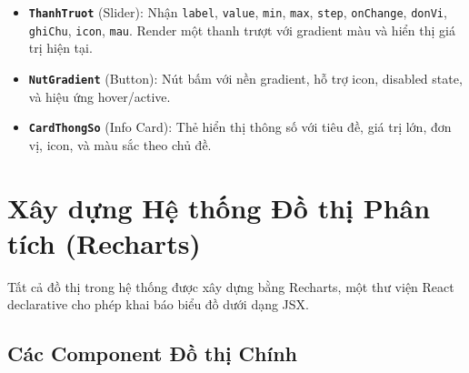 \begin{itemize}
    \item \textbf{\texttt{ThanhTruot}} (Slider): Nhận \texttt{label}, \texttt{value}, \texttt{min}, \texttt{max}, \texttt{step}, \texttt{onChange}, \texttt{donVi}, \texttt{ghiChu}, \texttt{icon}, \texttt{mau}. Render một thanh trượt với gradient màu và hiển thị giá trị hiện tại.
    
    \item \textbf{\texttt{NutGradient}} (Button): Nút bấm với nền gradient, hỗ trợ icon, disabled state, và hiệu ứng hover/active.
    
    \item \textbf{\texttt{CardThongSo}} (Info Card): Thẻ hiển thị thông số với tiêu đề, giá trị lớn, đơn vị, icon, và màu sắc theo chủ đề.
\end{itemize}

\section{Xây dựng Hệ thống Đồ thị Phân tích (Recharts)}

Tất cả đồ thị trong hệ thống được xây dựng bằng Recharts, một thư viện React declarative cho phép khai báo biểu đồ dưới dạng JSX.

\subsection{Các Component Đồ thị Chính}

